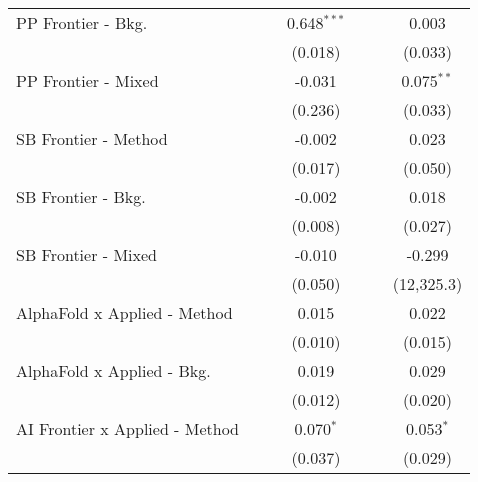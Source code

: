 \begin{tabular}{lcccccc}
   PP Frontier - Bkg.             &                &                & 0.648$^{***}$  &                &               & 0.003\\   
                                  &                &                & (0.018)        &                &               & (0.033)\\   
   PP Frontier - Mixed            &                &                & -0.031         &                &               & 0.075$^{**}$\\   
                                  &                &                & (0.236)        &                &               & (0.033)\\   
   SB Frontier - Method           &                &                & -0.002         &                &               & 0.023\\   
                                  &                &                & (0.017)        &                &               & (0.050)\\   
   SB Frontier - Bkg.             &                &                & -0.002         &                &               & 0.018\\   
                                  &                &                & (0.008)        &                &               & (0.027)\\   
   SB Frontier - Mixed            &                &                & -0.010         &                &               & -0.299\\   
                                  &                &                & (0.050)        &                &               & (12,325.3)\\   
   AlphaFold x Applied - Method   &                &                & 0.015          &                &               & 0.022\\   
                                  &                &                & (0.010)        &                &               & (0.015)\\   
   AlphaFold x Applied - Bkg.     &                &                & 0.019          &                &               & 0.029\\   
                                  &                &                & (0.012)        &                &               & (0.020)\\   
   AI Frontier x Applied - Method &                &                & 0.070$^{*}$    &                &               & 0.053$^{*}$\\   
                                  &                &                & (0.037)        &                &               & (0.029)\\   

\end{tabular}
